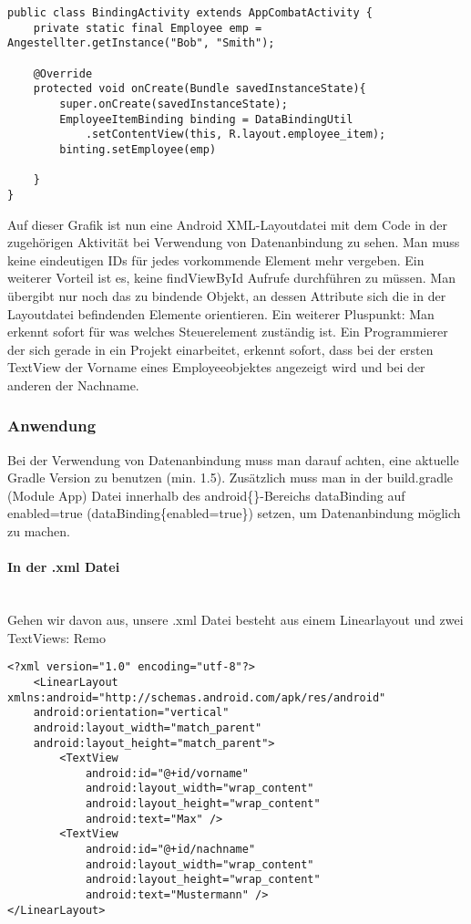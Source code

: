 \documentclass[FIPLY_base.tex]{subfiles}
\begin{document}
\begin{lstlisting}[caption={Die Activity vor dem Einsatz von DataBinding.},label=DescriptiveLabel]
public class BindingActivity extends AppCombatActivity {
	private static final Employee emp = Angestellter.getInstance("Bob", "Smith");

	@Override
	protected void onCreate(Bundle savedInstanceState){
		super.onCreate(savedInstanceState);
		EmployeeItemBinding binding = DataBindingUtil
			.setContentView(this, R.layout.employee_item);
		binting.setEmployee(emp)

	}
}
\end{lstlisting}


Auf dieser Grafik ist nun eine Android XML-Layoutdatei mit dem Code in der zugehörigen Aktivität bei Verwendung von Datenanbindung zu sehen. Man muss keine eindeutigen IDs für jedes vorkommende Element mehr vergeben. Ein weiterer Vorteil ist es, keine findViewById Aufrufe durchführen zu müssen. Man übergibt nur noch das zu bindende Objekt, an dessen Attribute sich die in der Layoutdatei befindenden Elemente orientieren. 
Ein weiterer Pluspunkt: Man erkennt sofort für was welches Steuerelement zuständig ist. Ein Programmierer der sich gerade in ein Projekt einarbeitet, erkennt sofort, dass bei der ersten TextView der Vorname eines Employeeobjektes angezeigt wird und bei der anderen der Nachname.
\ \\

\subsubsection{Anwendung}
Bei der Verwendung von Datenanbindung muss man darauf achten, eine aktuelle Gradle Version zu benutzen (min. 1.5). Zusätzlich muss man in der build.gradle (Module App) Datei innerhalb des android\{\}-Bereichs dataBinding auf enabled=true (dataBinding\{enabled=true\}) setzen, um Datenanbindung möglich zu machen.
\paragraph{In der .xml Datei}
\ \\
Gehen wir davon aus, unsere .xml Datei besteht aus einem Linearlayout und zwei TextViews: Remo

\begin{lstlisting}[caption={Layoutcode ohne jedliche Datenanbindung.},label=DescriptiveLabel]
<?xml version="1.0" encoding="utf-8"?>
	<LinearLayout xmlns:android="http://schemas.android.com/apk/res/android"
	android:orientation="vertical"
	android:layout_width="match_parent"
	android:layout_height="match_parent">
		<TextView
			android:id="@+id/vorname"
			android:layout_width="wrap_content"
			android:layout_height="wrap_content"
			android:text="Max" />
		<TextView
			android:id="@+id/nachname"
			android:layout_width="wrap_content"
			android:layout_height="wrap_content"
			android:text="Mustermann" />
</LinearLayout>

\end{lstlisting}
\end{document}
